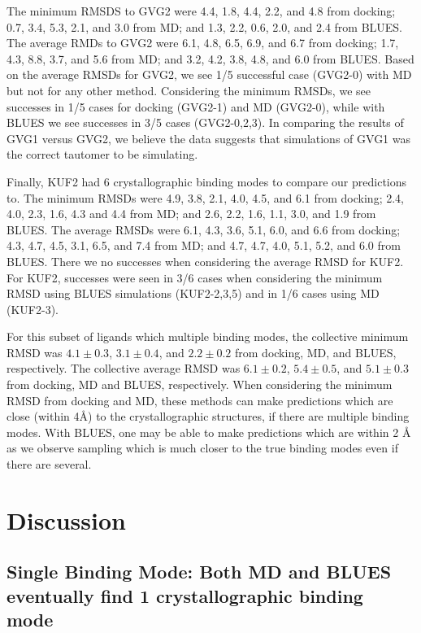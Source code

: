 The minimum RMSDS to GVG2 were 4.4, 1.8, 4.4, 2.2, and 4.8 from docking; 0.7, 3.4, 5.3, 2.1, and 3.0 from MD; and 1.3, 2.2, 0.6, 2.0, and 2.4 from BLUES.
The average RMDs to GVG2 were 6.1, 4.8, 6.5, 6.9, and 6.7 from docking; 1.7, 4.3, 8.8, 3.7, and 5.6 from MD; and 3.2, 4.2, 3.8, 4.8, and 6.0 from BLUES.
Based on the average RMSDs for GVG2, we see 1/5 successful case (GVG2-0) with MD but not for any other method.
Considering the minimum RMSDs, we see successes in 1/5 cases for docking (GVG2-1) and MD (GVG2-0), while with BLUES we see successes in 3/5 cases (GVG2-0,2,3).
In comparing the results of GVG1 versus GVG2, we believe the data suggests that simulations of GVG1 was the correct tautomer to be simulating.

Finally, KUF2 had 6 crystallographic binding modes to compare our predictions to.
The minimum RMSDs were 4.9, 3.8, 2.1, 4.0, 4.5, and 6.1 from docking; 2.4, 4.0, 2.3, 1.6, 4.3 and 4.4 from MD; and 2.6, 2.2, 1.6, 1.1, 3.0, and 1.9 from BLUES.
The average RMSDs were 6.1, 4.3, 3.6, 5.1, 6.0, and 6.6 from docking; 4.3, 4.7, 4.5, 3.1, 6.5, and 7.4 from MD; and 4.7, 4.7, 4.0, 5.1, 5.2, and 6.0 from BLUES.
There we no successes when considering the average RMSD for KUF2.
For KUF2, successes were seen in 3/6 cases when considering the minimum RMSD using BLUES simulations (KUF2-2,3,5) and in 1/6 cases using MD (KUF2-3).

For this subset of ligands which multiple binding modes, the collective minimum RMSD was $4.1 \pm 0.3$, $3.1 \pm 0.4$, and $2.2 \pm 0.2$ from docking, MD, and BLUES, respectively.
The collective average RMSD was $6.1 \pm 0.2$, $5.4 \pm 0.5$, and $5.1 \pm 0.3$ from docking, MD and BLUES, respectively.
When considering the minimum RMSD from docking and MD, these methods can make predictions which are close (within 4{\AA}) to the crystallographic structures, if there are multiple binding modes.
With BLUES, one may be able to make predictions which are within 2 {\AA} as we observe sampling which is much closer to the true binding modes even if there are several.

\section{Discussion}
\subsection{Single Binding Mode: Both MD and BLUES eventually find 1 crystallographic binding mode}

